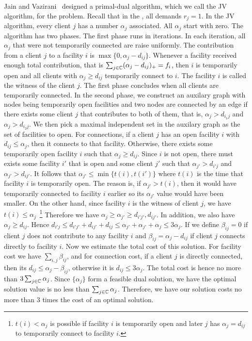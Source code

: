 \documentclass[oneside,final]{ucr}
\begin{document}
Jain and Vazirani~\cite{JainV01} designed a primal-dual
algorithm, which we call the JV algorithm, for the {\UFL}
problem. Recall that in the {\UFL}, all demands $r_j =
1$. In the JV algorithm, every client $j$ has a number
$\alpha_j$ associated. All $\alpha_j$ start with zero. The
algorithm has two phases. The first phase runs in
iterations. In each iteration, all $\alpha_j$ that were not
temporarily connected are raise uniformly. The contribution
from a client $j$ to a facility $i$ is $\max\{0, \alpha_j -
d_{ij}\}$. Whenever a facility received enough total
contribution, that is $\sum_{j\in\mathbb{C}} (\alpha_j -
d_{ij})_+ = f_i$, then $i$ is temporarily open and all
clients with $\alpha_j \geq d_{ij}$ temporarily connect to
$i$. The facility $i$ is called the witness of the client
$j$. The first phase concludes when all clients are
temporarily connected. In the second phase, we construct an
auxilary graph with nodes being temporarily open facilities
and two nodes are connected by an edge if there exists some
client $j$ that contributes to both of them, that is,
$\alpha_j > d_{i_1 j}$ and $\alpha_j > d_{i_2 j}$. We then
pick a maximal independent set in the auxilary graph as the
set of facilities to open. For connections, if a client $j$
has an open facility $i$ with $d_{ij} \leq \alpha_j$, then
it connects to that facility. Otherwise, there exists some
temporarily open facility $i$ such that $\alpha_j \geq
d_{ij}$. Since $i$ is not open, there must exists some
facility $i'$ that is open and some client $j'$ such that
$\alpha_{j'} > d_{i'j}$ and $\alpha_{j'} > d_{i j'}$. It
follows that $\alpha_{j'} \leq \min\{t(i), t(i')\}$ where
$t(i)$ is the time that facility $i$ is temporarily
open. The reason is, if $\alpha_{j'} > t(i)$, then it would
have temporarily connected to facility $i$ earlier so its
$\alpha_{j'}$ value would have been smaller. On the other
hand, since facility $i$ is the witness of client $j$, we
have $t(i) \leq \alpha_j$~\footnote{$t(i) < \alpha_j$ is
  possible if facility $i$ is temporarily open and later $j$
  has $\alpha_j = d_{ij}$ to temporarily connect to facility
  $i$.} Therefore we have $\alpha_j \geq \alpha_{j'} \geq
d_{i'j'}, d_{i j'}$. In addition, we also have $\alpha_j
\geq d_{ij}$. Hence $d_{i'j} \leq d_{i'j'} + d_{ij'} +
d_{ij} \leq \alpha_{j'} + \alpha_{j'} + \alpha_j \leq
3\alpha_j$. If we define $\beta_{ij} = 0$ if client $j$ does
not contribute to any facility $i$ and $\beta_{ij} =
\alpha_j - d_{ij}$ if client $j$ connects directly to
facility $i$. Now we estimate the total cost of this
solution. For facility cost we have $\sum_{i,j} \beta_{ij}$,
and for connection cost, if a client $j$ is directly
connected, then its $d_{ij} \leq \alpha_j - \beta_{ij}$,
otherwise it is $d_{ij} \leq 3\alpha_j$. The total cost is
hence no more than $3\sum_{j\in\mathbb{C}} \alpha_j$. Since
$\{\alpha_j\}$ form a feasible dual solution, we have the
optimal solution value is no less than
$\sum_{j\in\mathbb{C}} \alpha_j$. Therefore, we have our
solution costs no more than $3$ times the cost of an optimal
solution.
\end{document}
